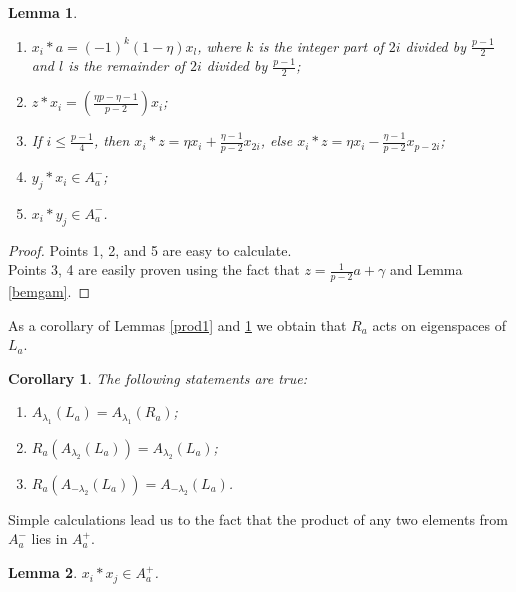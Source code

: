 \documentclass[12pt]{article}
\newcommand\gam{\gamma}
\newcommand\lm{\lambda}
\newtheorem{lem}{Lemma}
\newtheorem{cor}{Corollary}
\begin{document}
\begin{lem}\label{prod2}
	
\begin{enumerate}
\item $x_i*a=(-1)^k(1-\eta)x_{l}$, where $k$ is the integer part of $2i$ divided by $\frac{p-1}{2}$ and $l$ is the remainder of $2i$ divided by $\frac{p-1}{2}$;  

\item $z*x_i=(\frac{\eta p-\eta-1}{p-2})x_i$;

\item If $i\leq\frac{p-1}{4}$, then $x_i*z= \eta x_i+ \frac{\eta-1}{p-2}x_{2i}$, else $x_i*z= \eta x_i- \frac{\eta-1}{p-2}x_{p-2i}$;

\item $y_j*x_i\in A_a^{-}$;

\item $x_i*y_j\in A_a^{-}$.
\end{enumerate}
\end{lem}
\begin{proof}
Points 1, 2, and 5 are easy to calculate.\\
Points 3, 4 are easily proven using the fact that $z=\frac{1}{p-2}a+\gam$ and Lemma \ref{bemgam}.
\end{proof}
As a corollary of Lemmas \ref{prod1} and \ref{prod2} we obtain that $R_a$ acts on eigenspaces of $L_a$.
\begin{cor}\label{ra}
The following statements are true:
 \begin{enumerate}
		\item $A_{\lm_1}(L_a)=A_{\lm_1}(R_a)$;
		\item $R_a(A_{\lm_2}(L_a))=A_{\lm_2}(L_a)$;
		\item $R_a(A_{-\lm_2}(L_a))=A_{-\lm_2}(L_a)$.
\end{enumerate}
\end{cor}
\smallskip

Simple calculations lead us to the fact that the product of any two elements from $A^-_a$ lies in $A^+_a$.
\begin{lem}\label{prod3}
$x_i*x_j\in A_a^+$.	
\end{lem}
\end{document}
